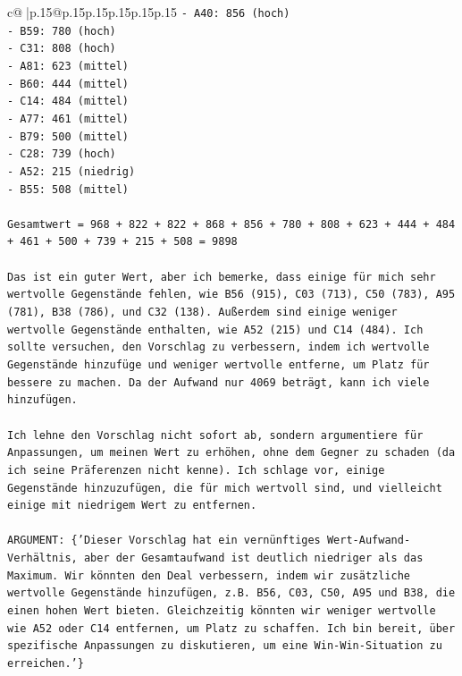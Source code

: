 \documentclass{article}
\begin{document}
{\begin{supertabular}{c@{$\;$}|p{.15\linewidth}@{}p{.15\linewidth}p{.15\linewidth}p{.15\linewidth}p{.15\linewidth}p{.15\linewidth}}
{{{\texttt{{-} A40: 856 (hoch)} \\
\texttt{{-} B59: 780 (hoch)} \\
\texttt{{-} C31: 808 (hoch)} \\
\texttt{{-} A81: 623 (mittel)} \\
\texttt{{-} B60: 444 (mittel)} \\
\texttt{{-} C14: 484 (mittel)} \\
\texttt{{-} A77: 461 (mittel)} \\
\texttt{{-} B79: 500 (mittel)} \\
\texttt{{-} C28: 739 (hoch)} \\
\texttt{{-} A52: 215 (niedrig)} \\
\texttt{{-} B55: 508 (mittel)} \\
\\ 
\texttt{Gesamtwert = 968 + 822 + 822 + 868 + 856 + 780 + 808 + 623 + 444 + 484 + 461 + 500 + 739 + 215 + 508 = 9898} \\
\\ 
\texttt{Das ist ein guter Wert, aber ich bemerke, dass einige für mich sehr wertvolle Gegenstände fehlen, wie B56 (915), C03 (713), C50 (783), A95 (781), B38 (786), und C32 (138). Außerdem sind einige weniger wertvolle Gegenstände enthalten, wie A52 (215) und C14 (484). Ich sollte versuchen, den Vorschlag zu verbessern, indem ich wertvolle Gegenstände hinzufüge und weniger wertvolle entferne, um Platz für bessere zu machen. Da der Aufwand nur 4069 beträgt, kann ich viele hinzufügen.} \\
\\ 
\texttt{Ich lehne den Vorschlag nicht sofort ab, sondern argumentiere für Anpassungen, um meinen Wert zu erhöhen, ohne dem Gegner zu schaden (da ich seine Präferenzen nicht kenne). Ich schlage vor, einige Gegenstände hinzuzufügen, die für mich wertvoll sind, und vielleicht einige mit niedrigem Wert zu entfernen.} \\
\\ 
\texttt{ARGUMENT: \{'Dieser Vorschlag hat ein vernünftiges Wert{-}Aufwand{-}Verhältnis, aber der Gesamtaufwand ist deutlich niedriger als das Maximum. Wir könnten den Deal verbessern, indem wir zusätzliche wertvolle Gegenstände hinzufügen, z.B. B56, C03, C50, A95 und B38, die einen hohen Wert bieten. Gleichzeitig könnten wir weniger wertvolle wie A52 oder C14 entfernen, um Platz zu schaffen. Ich bin bereit, über spezifische Anpassungen zu diskutieren, um eine Win{-}Win{-}Situation zu erreichen.'\} } \\
\\ 
}}}
\end{supertabular}}
\end{document}
